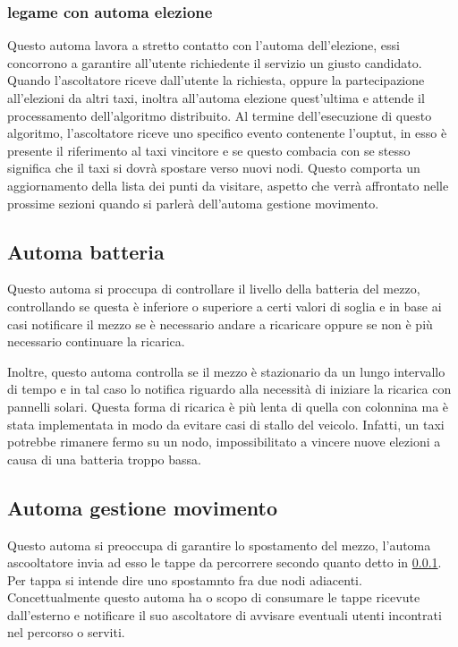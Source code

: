 \subsubsection{legame con automa elezione} \label{listenerElection}
Questo automa lavora a stretto contatto con l'automa dell'elezione, essi concorrono a garantire all'utente richiedente il servizio un giusto candidato. Quando l'ascoltatore riceve dall'utente la richiesta, oppure la partecipazione all'elezioni da altri taxi, inoltra all'automa elezione quest'ultima e attende il processamento dell'algoritmo distribuito. Al termine dell'esecuzione di questo algoritmo, l'ascoltatore riceve uno specifico evento contenente l'ouptut, in esso è presente il riferimento al taxi vincitore e se questo combacia con se stesso significa che il taxi si dovrà spostare verso nuovi nodi. Questo comporta un aggiornamento della lista dei punti da visitare, aspetto che verrà affrontato nelle prossime sezioni quando si parlerà dell'automa gestione movimento.

\subsection{Automa batteria} \label{automaBatteria}
Questo automa si proccupa di controllare il livello della batteria del mezzo, controllando se questa è inferiore o superiore a certi valori di soglia e in base ai casi notificare il mezzo se è necessario andare a ricaricare oppure se non è più necessario continuare la ricarica.

Inoltre, questo automa controlla se il mezzo è stazionario da un lungo intervallo di tempo e in tal caso lo notifica riguardo alla necessità di iniziare la ricarica con pannelli solari. Questa forma di ricarica è più lenta di quella con colonnina ma è stata implementata in modo da evitare casi di stallo del veicolo. Infatti, un taxi potrebbe rimanere fermo su un nodo, impossibilitato a vincere nuove elezioni a causa di una batteria troppo bassa. 

\subsection{Automa gestione movimento} \label{automaMoving}

Questo automa si preoccupa di garantire lo spostamento del mezzo, l'automa ascooltatore invia ad esso le tappe da percorrere secondo quanto detto in \ref{listenerElection}.
Per tappa si intende dire uno spostamnto fra due nodi adiacenti. Concettualmente questo automa ha o scopo di consumare le tappe ricevute dall'esterno e notificare il suo ascoltatore di avvisare eventuali utenti incontrati nel percorso o serviti. 

